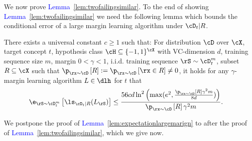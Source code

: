 We now prove \textcolor{blue}{Lemma}~\ref{lem:twofailingsimilar}. To the end of showing \textcolor{blue}{Lemma}~\ref{lem:twofailingsimilar} we need the following lemma which bounds the conditional error of a large margin learning algorithm under $ \cD_{t}|R $.

\begin{lemma}\label{lem:expectationlargemarign}
    There exists a universal constant $ c\geq1 $ such that: For distribution $ \cD $ over $ \cX $, target concept $ t $,  hypothesis class $ \cH \subseteq \{-1,1  \}^{\cX} $ with VC-dimension $ d $,  training sequence size $ m $, margin $ 0<\gamma<1 $, i.i.d. training sequence $ \rS\sim \cD_{t}^{m} $, subset $ R\subseteq \cX $ such that $ \p_{\rx\sim \cD}\left[R\right]:=\p_{\rx\sim\cD}\left[\rx\in R\right]\not=0 $, it holds for any $ \gamma $-margin learning algorithm $ L\in \dlh $ for $ t $  that  
    \begin{align*}
        \e_{\rS\sim \cD_{t}^{m}}\left[\ls_{\cD_{t}|R}(L_{\rS})\right] \leq\frac{56 cd\ln^{2}{\left( \max(e^{2},\frac{\p_{\rx\sim \cD}\left[R\right]\gamma^{2}m}{8d})\right)}}{\p_{\rx\sim \cD}\left[R\right]\gamma^{2}m}.
    \end{align*}
\end{lemma}

We postpone the proof of \textcolor{blue}{Lemma}~\ref{lem:expectationlargemarign} to after the proof of \textcolor{blue}{Lemma}~\ref{lem:twofailingsimilar}, which we give now. 

